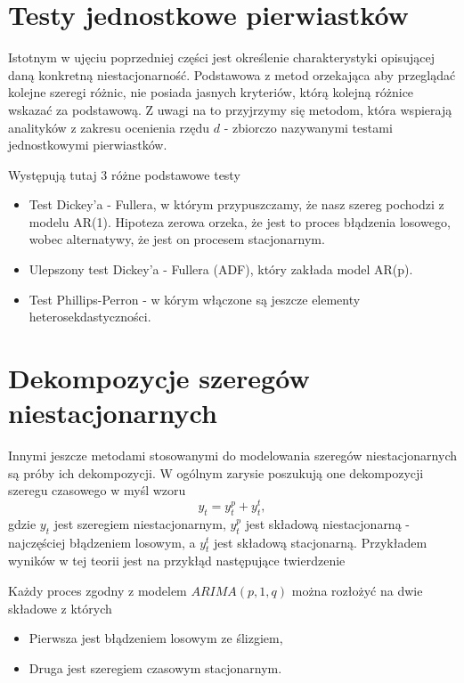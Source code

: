 \documentclass[10pt,a4paper]{book}
\begin{document}
\section{Testy jednostkowe pierwiastków}

Istotnym w ujęciu poprzedniej części jest określenie charakterystyki opisującej daną konkretną niestacjonarność. Podstawowa z metod orzekająca aby przeglądać kolejne szeregi różnic, nie posiada jasnych kryteriów, którą kolejną różnice wskazać za podstawową. Z uwagi na to przyjrzymy się metodom, która wspierają analityków z zakresu ocenienia rzędu $d$ - zbiorczo nazywanymi testami jednostkowymi pierwiastków.

Występują tutaj 3 różne podstawowe testy
\begin{itemize}
\item Test Dickey'a - Fullera, w którym przypuszczamy, że nasz szereg pochodzi z modelu AR(1). Hipoteza zerowa orzeka, że jest to proces błądzenia losowego, wobec alternatywy, że jest on procesem stacjonarnym. 
\item Ulepszony test Dickey'a - Fullera (ADF), który zakłada model AR(p). 
\item Test Phillips-Perron - w kórym włączone są jeszcze elementy heterosekdastyczności.  
\end{itemize}

\section{Dekompozycje szeregów niestacjonarnych}

Innymi jeszcze metodami stosowanymi do modelowania szeregów niestacjonarnych są próby ich dekompozycji. W ogólnym zarysie poszukują one dekompozycji szeregu czasowego w myśl wzoru
$$
y_t = y_t^p + y_t^t,
$$
gdzie $y_t$ jest szeregiem niestacjonarnym, $y_t^p$ jest składową niestacjonarną - najczęściej błądzeniem losowym, a $y_t^t$ jest składową stacjonarną. Przykładem wyników w tej teorii jest na przykłąd następujące twierdzenie

\begin{theorem}
Każdy proces zgodny z modelem $ARIMA(p,1,q)$ można rozłożyć na dwie składowe z których 
\begin{itemize}
\item Pierwsza jest błądzeniem losowym ze ślizgiem,
\item Druga jest szeregiem czasowym stacjonarnym.
\end{itemize}
\end{theorem}
\end{document}
